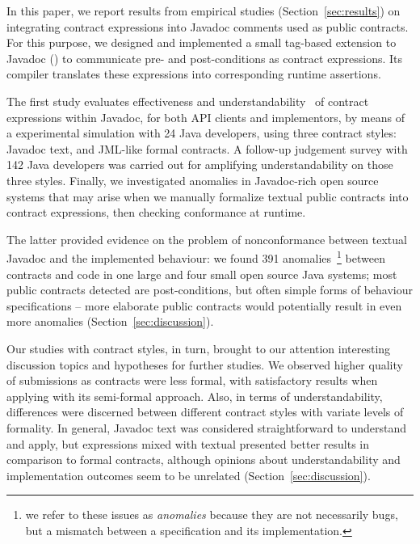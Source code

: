 In this paper, we report results from empirical studies (Section~\ref{sec:results}) on integrating contract expressions into Javadoc comments used as public contracts. 
For this purpose, we designed and implemented a small tag-based extension to Javadoc (\contractjdoc{}) to communicate pre- and post-conditions as contract expressions.
Its compiler translates these expressions into corresponding runtime assertions.

The first study evaluates effectiveness and understandability~\cite{Scalabrino2017} of contract expressions within Javadoc, for both API clients and implementors, by means of a experimental simulation with 24 Java developers, using three contract styles: Javadoc text, \contractjdoc{} and JML-like formal contracts. 
A follow-up judgement survey with 142 Java developers was carried out for amplifying understandability on those three styles.
Finally, we investigated anomalies in Javadoc-rich open source systems that may arise when we manually formalize textual public contracts into contract expressions, then checking conformance at runtime.

The latter provided evidence on the problem of nonconformance between textual Javadoc and the implemented behaviour: we found 391 anomalies~\footnote{we refer to these issues as \emph{anomalies} because they are not necessarily bugs, but a mismatch between a specification and its implementation.} between contracts and code in one large and four small open source Java systems; most public contracts detected are post-conditions, but often simple forms of behaviour specifications -- more elaborate public contracts would potentially result in even more anomalies (Section~\ref{sec:discussion}).

Our studies with contract styles, in turn, brought to our attention interesting discussion topics and hypotheses for further studies. 
We observed higher quality of submissions as contracts were less formal, with satisfactory results when applying \contractjdoc{} with its semi-formal approach. Also, in terms of understandability, differences were discerned between different contract styles with variate levels of formality.
In general, Javadoc text was considered straightforward to understand and apply, but \contractjdoc{} expressions mixed with textual presented better results in comparison to formal contracts, although opinions about understandability and implementation outcomes seem to be unrelated (Section~\ref{sec:discussion}).

